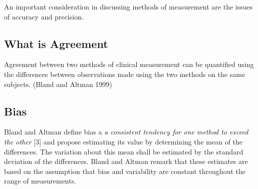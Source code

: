 \documentclass[12pt, a4paper]{report}
\begin{document}
An important consideration in discussing methods of measurement are the issues of accuracy and precision.

\subsection{What is Agreement}

Agreement between two methods of clinical measurement can be quantified using the differences between observations made using the two methods on the same subjects. (Bland and Altman 1999)




\subsection{Bias}
Bland and Altman define bias a \emph{a consistent tendency for one
method to exceed the other} [$3$] and propose estimating its value
by determining the mean of the differences. The variation about
this mean shall be estimated by the  standard deviation of the
differences. Bland and Altman remark that these estimates are based on the
assumption that bias and variability are constant throughout the
range of measurements.





\end{document}
